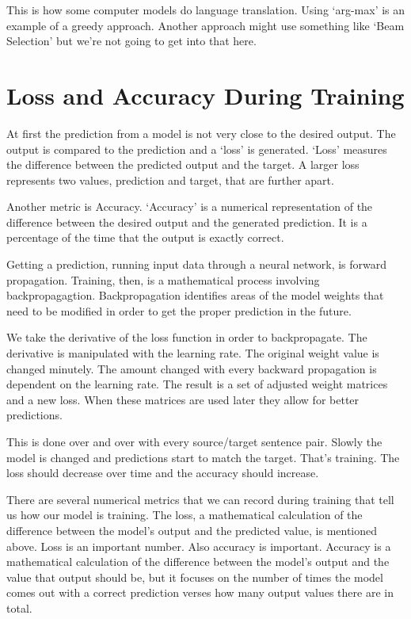 This is how some computer models do language translation. Using `arg-max' is an example of a greedy approach. Another approach might use something like `Beam Selection' but we're not going to get into that here.


\section{Loss and Accuracy During Training}

At first the prediction from a model is not very close to the desired output. The output is compared to the prediction and a `loss' is generated. `Loss' measures the difference between the predicted output and the target. A larger loss represents two values, prediction and target, that are further apart. 


Another metric is Accuracy. `Accuracy' is a numerical representation of the difference between the desired output and the generated prediction. It is a percentage of the time that the output is exactly correct.

Getting a prediction, running input data through a neural network, is forward propagation. Training, then, is a mathematical process involving backpropagagtion. Backpropagation identifies areas of the model weights that need to be modified in order to get the proper prediction in the future.

We take the derivative of the loss function in order to backpropagate. The derivative is manipulated with the learning rate. The original weight value is changed minutely. The amount changed with every backward propagation is dependent on the learning rate. The result is a set of adjusted weight matrices and a new loss. When these matrices are used later they allow for better predictions. 

This is done over and over with every source/target sentence pair. Slowly the model is changed and predictions start to match the target. That's training. The loss should decrease over time and the accuracy should increase.

There are several numerical metrics that we can record during training that tell us how our model is training. The loss, a mathematical calculation of the difference between the model's output and the predicted value, is mentioned above. Loss is an important number. Also accuracy is important. Accuracy is a mathematical calculation of the difference between the model's output and the value that output should be, but it focuses on the number of times the model comes out with a correct prediction verses how many output values there are in total.

